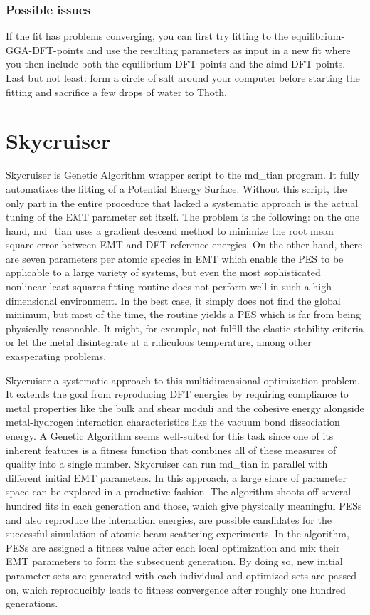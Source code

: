 \documentclass[twoside, 11pt, titlepage, captions=nooneline, a4paper, headsepline]{scrbook}%
\newcommand{\9}{\mathrm}
\newcommand{\0}{\,\mathrm}
\begin{document}
\subsection{Possible issues}
If the fit has problems converging, you can first try fitting to the equilibrium-GGA-DFT-points and use the resulting parameters as input in a new fit where you then include both the equilibrium-DFT-points and the aimd-DFT-points.
Last but not least: form a circle of salt around your computer before starting the fitting and sacrifice a few drops of water to Thoth.\\


\chapter{Skycruiser}
Skycruiser is Genetic Algorithm wrapper script to the md\_tian program. It fully automatizes the fitting of a Potential Energy Surface. Without this script, the only part in the entire procedure that lacked a systematic approach is the actual tuning of the EMT parameter set itself. The problem is the following: on the one hand, md\_tian uses a gradient descend method to minimize the root mean square error between EMT and DFT reference energies. On the other hand, there are seven parameters per atomic species in EMT which enable the PES to be applicable to a large variety of systems, but even the most sophisticated nonlinear least squares fitting routine does not perform well in such a high dimensional environment. In the best case, it simply does not find the global minimum, but most of the time, the routine yields a PES which is far from being physically reasonable. It might, for example, not fulfill the elastic stability criteria or let the metal disintegrate at a ridiculous temperature, among other exasperating problems.

Skycruiser a systematic approach to this multidimensional optimization problem. It extends the goal from reproducing DFT energies by requiring compliance to metal properties like the bulk and shear moduli and the cohesive energy alongside metal-hydrogen interaction characteristics like the vacuum bond dissociation energy. A Genetic Algorithm seems well-suited for this task since one of its inherent features is a fitness function that combines all of these measures of quality into a single number. Skycruiser can run md\_tian in parallel with different initial EMT parameters. In this approach, a large share of parameter space can be explored in a productive fashion. The algorithm shoots off several hundred fits in each generation and those, which give physically meaningful PESs and also reproduce the interaction energies, are possible candidates for the successful simulation of atomic beam scattering experiments. In the algorithm, PESs are assigned a fitness value after each local optimization and mix their EMT parameters to form the subsequent generation. By doing so, new initial parameter sets are generated with each individual and optimized sets are passed on, which reproducibly leads to fitness convergence after roughly one hundred generations.
\end{document}
